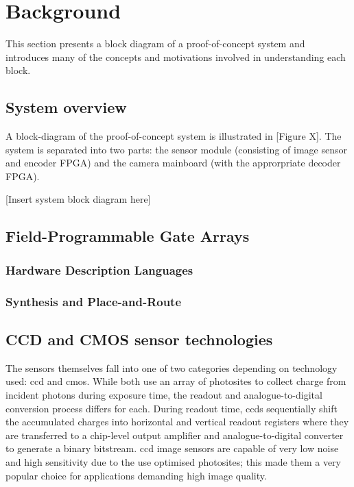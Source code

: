 \chapter{Background}

This section presents a block diagram of a proof-of-concept system and introduces many of the concepts and motivations involved in understanding each block.

\section{System overview}

A block-diagram of the proof-of-concept system is illustrated in [Figure X]. The system is separated into two parts: the sensor module (consisting of image sensor and encoder FPGA) and the camera mainboard (with the approrpriate decoder FPGA).

[Insert system block diagram here]

\section{Field-Programmable Gate Arrays}

\subsection{Hardware Description Languages}
\subsection{Synthesis and Place-and-Route}

\section{CCD and CMOS sensor technologies}

The sensors themselves fall into one of two categories depending on technology used: \gls{ccd} and \gls{cmos}. While both use an array of photosites to collect charge from incident photons during exposure time, the readout and analogue-to-digital conversion process differs for each. During readout time, \glspl{ccd} sequentially shift the accumulated charges into horizontal and vertical readout registers where they are transferred to a chip-level output amplifier and analogue-to-digital converter to generate a binary bitstream. \gls{ccd} image sensors are capable of very low noise and high sensitivity due to the use optimised photosites; this made them a very popular choice for applications demanding high image quality.

